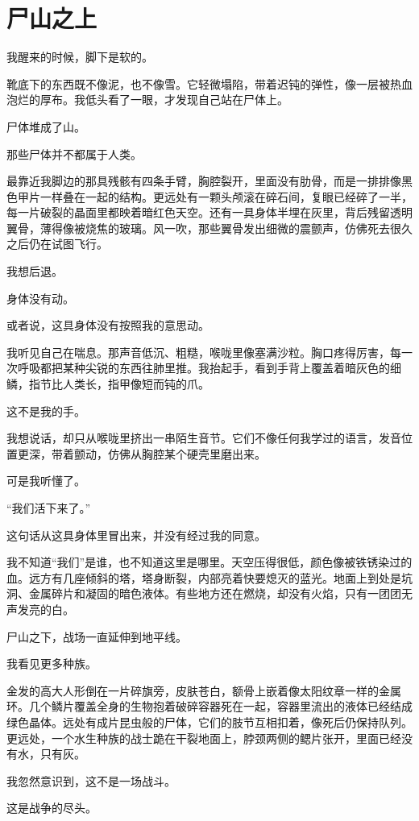 \chapter{尸山之上}

我醒来的时候，脚下是软的。

靴底下的东西既不像泥，也不像雪。它轻微塌陷，带着迟钝的弹性，像一层被热血泡烂的厚布。我低头看了一眼，才发现自己站在尸体上。

尸体堆成了山。

那些尸体并不都属于人类。

最靠近我脚边的那具残骸有四条手臂，胸腔裂开，里面没有肋骨，而是一排排像黑色甲片一样叠在一起的结构。更远处有一颗头颅滚在碎石间，复眼已经碎了一半，每一片破裂的晶面里都映着暗红色天空。还有一具身体半埋在灰里，背后残留透明翼骨，薄得像被烧焦的玻璃。风一吹，那些翼骨发出细微的震颤声，仿佛死去很久之后仍在试图飞行。

我想后退。

身体没有动。

或者说，这具身体没有按照我的意思动。

我听见自己在喘息。那声音低沉、粗糙，喉咙里像塞满沙粒。胸口疼得厉害，每一次呼吸都把某种尖锐的东西往肺里推。我抬起手，看到手背上覆盖着暗灰色的细鳞，指节比人类长，指甲像短而钝的爪。

这不是我的手。

我想说话，却只从喉咙里挤出一串陌生音节。它们不像任何我学过的语言，发音位置更深，带着颤动，仿佛从胸腔某个硬壳里磨出来。

可是我听懂了。

“我们活下来了。”

这句话从这具身体里冒出来，并没有经过我的同意。

我不知道“我们”是谁，也不知道这里是哪里。天空压得很低，颜色像被铁锈染过的血。远方有几座倾斜的塔，塔身断裂，内部亮着快要熄灭的蓝光。地面上到处是坑洞、金属碎片和凝固的暗色液体。有些地方还在燃烧，却没有火焰，只有一团团无声发亮的白。

尸山之下，战场一直延伸到地平线。

我看见更多种族。

金发的高大人形倒在一片碎旗旁，皮肤苍白，额骨上嵌着像太阳纹章一样的金属环。几个鳞片覆盖全身的生物抱着破碎容器死在一起，容器里流出的液体已经结成绿色晶体。远处有成片昆虫般的尸体，它们的肢节互相扣着，像死后仍保持队列。更远处，一个水生种族的战士跪在干裂地面上，脖颈两侧的鳃片张开，里面已经没有水，只有灰。

我忽然意识到，这不是一场战斗。

这是战争的尽头。

